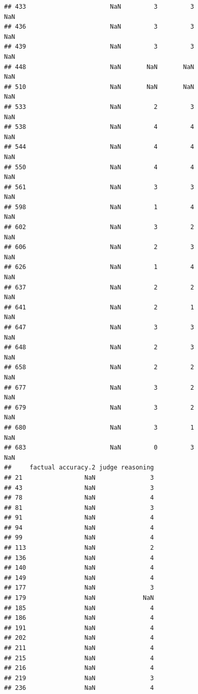 \documentclass[
]{article}
\begin{document}
\begin{verbatim}
## 433                       NaN         3         3                NaN
## 436                       NaN         3         3                NaN
## 439                       NaN         3         3                NaN
## 448                       NaN       NaN       NaN                NaN
## 510                       NaN       NaN       NaN                NaN
## 533                       NaN         2         3                NaN
## 538                       NaN         4         4                NaN
## 544                       NaN         4         4                NaN
## 550                       NaN         4         4                NaN
## 561                       NaN         3         3                NaN
## 598                       NaN         1         4                NaN
## 602                       NaN         3         2                NaN
## 606                       NaN         2         3                NaN
## 626                       NaN         1         4                NaN
## 637                       NaN         2         2                NaN
## 641                       NaN         2         1                NaN
## 647                       NaN         3         3                NaN
## 648                       NaN         2         3                NaN
## 658                       NaN         2         2                NaN
## 677                       NaN         3         2                NaN
## 679                       NaN         3         2                NaN
## 680                       NaN         3         1                NaN
## 683                       NaN         0         3                NaN
##     factual accuracy.2 judge reasoning
## 21                 NaN               3
## 43                 NaN               3
## 78                 NaN               4
## 81                 NaN               3
## 91                 NaN               4
## 94                 NaN               4
## 99                 NaN               4
## 113                NaN               2
## 136                NaN               4
## 140                NaN               4
## 149                NaN               4
## 177                NaN               3
## 179                NaN             NaN
## 185                NaN               4
## 186                NaN               4
## 191                NaN               4
## 202                NaN               4
## 211                NaN               4
## 215                NaN               4
## 216                NaN               4
## 219                NaN               3
## 236                NaN               4

\end{verbatim}
\end{document}

